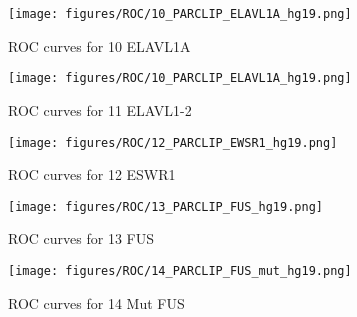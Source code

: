 \documentclass[11pt]{article}
\begin{document}
    
    
    \begin{figure}
        \begin{center}
            \texttt{[image: figures/ROC/10\_PARCLIP\_ELAVL1A\_hg19.png]}
            \caption{ROC curves for 10 ELAVL1A}
            \label{fig:ROC10 ELAVL1A}
        \end{center}
    \end{figure}

    
    
    \begin{figure}
        \begin{center}
            \texttt{[image: figures/ROC/10\_PARCLIP\_ELAVL1A\_hg19.png]}
            \caption{ROC curves for 11 ELAVL1-2}
            \label{fig:ROC11 ELAVL1-2}
        \end{center}
    \end{figure}

    
    
    \begin{figure}
        \begin{center}
            \texttt{[image: figures/ROC/12\_PARCLIP\_EWSR1\_hg19.png]}
            \caption{ROC curves for 12 ESWR1}
            \label{fig:ROC12 ESWR1}
        \end{center}
    \end{figure}

    
    
    \begin{figure}
        \begin{center}
            \texttt{[image: figures/ROC/13\_PARCLIP\_FUS\_hg19.png]}
            \caption{ROC curves for 13 FUS}
            \label{fig:ROC13 FUS}
        \end{center}
    \end{figure}

    
    
    \begin{figure}
        \begin{center}
            \texttt{[image: figures/ROC/14\_PARCLIP\_FUS\_mut\_hg19.png]}
            \caption{ROC curves for 14 Mut FUS}
            \label{fig:ROC14 Mut FUS}
        \end{center}
    \end{figure}
\end{document}
